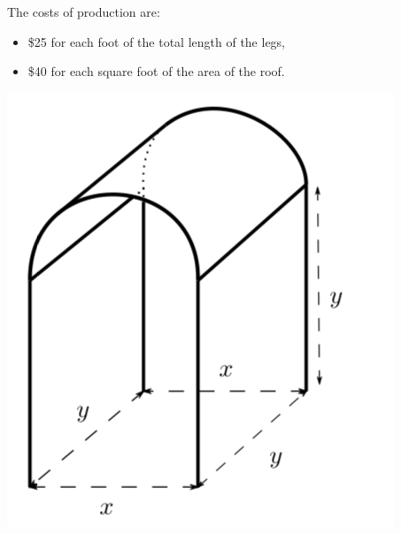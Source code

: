 \documentclass[11pt]{exam}
\begin{document}
\begin{questions}
\begin{minipage}{0.6\textwidth}
The costs of production are:
\begin{itemize}
\item \$25 for each foot of the total length of the legs, 
\item \$40 for each square foot of the area of the roof.
\end{itemize}
\end{minipage}
\begin{minipage}{0.3\textwidth}
  \begin{center}
    \includegraphics[scale=0.4]{Figures/pta.png}
  \end{center}
\end{minipage}


\end{questions}
\end{document}
